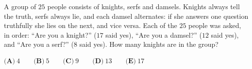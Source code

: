 A group of $25$ people consists of knights, serfs and damsels. Knights always tell the truth, serfs always lie, and each damsel alternates: if she answers one question truthfully she lies on the next, and vice versa. Each of the $25$ people was asked, in order: ``Are you a knight?'' ($17$ said yes), ``Are you a damsel?'' ($12$ said yes), and ``Are you a serf?'' ($8$ said yes). How many knights are in the group?

$\textbf{(A)}\ 4\qquad\textbf{(B)}\ 5\qquad\textbf{(C)}\ 9\qquad\textbf{(D)}\ 13\qquad\textbf{(E)}\ 17$
